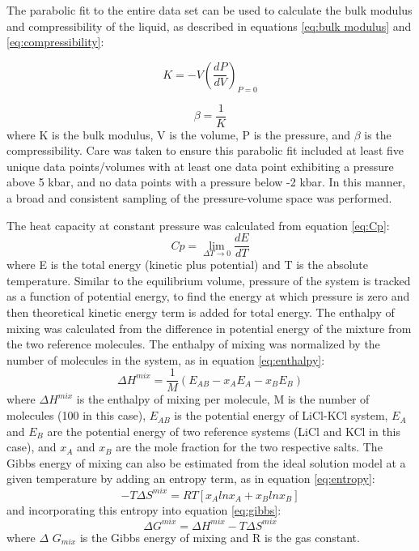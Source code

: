 \documentclass[review]{elsarticle}
\begin{document}
The parabolic fit to the entire data set can be used to calculate the bulk modulus and compressibility of the liquid, as described in equations \ref{eq:bulk modulus} and \ref{eq:compressibility}:

\begin{equation}
\label{eq:bulk modulus}
K = -V {(\frac{dP}{dV})}_{P=0}
\end{equation}

\begin{equation}
\label{eq:compressibility}
\beta = \frac{1}{K}
\end{equation}where K is the bulk modulus, V is the volume, P is the pressure, and $\beta$ is the compressibility. Care was taken to ensure this parabolic fit included at least five unique data points/volumes with at least one data point exhibiting a pressure above 5 kbar, and no data points with a pressure below  -2 kbar. In this manner, a broad and consistent sampling of the pressure-volume space was performed. 

The heat capacity at constant pressure was calculated from equation \ref{eq:Cp}:
\begin{equation}
\label{eq:Cp}
Cp =\lim_{\Delta T\to0} \frac{dE}{dT}
\end{equation}
where E is the total energy (kinetic plus potential) and T is the absolute temperature. Similar to the equilibrium volume, pressure of the system is tracked as a function of potential energy, to find the energy at which pressure is zero and then theoretical kinetic energy term is added for total energy. The enthalpy of mixing was calculated from the difference in potential energy of the mixture from the two reference molecules. The enthalpy of mixing was normalized by the number of molecules in the system, as in equation \ref{eq:enthalpy}:
\begin{equation}
    \label{eq:enthalpy}
    \Delta H^{mix} = \frac{1}{M}(E_{AB} - x_A E_A - x_B E_B)
\end{equation} 
where $\Delta H^{mix}$ is the enthalpy of mixing per molecule, M is the number of molecules (100 in this case), $E_{AB}$ is the potential energy of LiCl-KCl system, $E_A$ and $E_B$ are the potential energy of two reference systems (LiCl and KCl in this case), and $x_A$ and $x_B$ are the mole fraction for the two respective salts. The Gibbs energy of mixing can also be estimated from the ideal solution model \cite{dehoff2006} at a given temperature by adding an entropy term, as in equation \ref{eq:entropy}: 
\begin{equation}
    \label{eq:entropy}
    -T \Delta S^{mix}= RT[x_A ln x_A + x_B ln x_B]
\end{equation}and incorporating this entropy into  equation \ref{eq:gibbs}:
\begin{equation}
    \label{eq:gibbs}
    \Delta G^{mix} = \Delta H^{mix} -T \Delta S^{mix}
\end{equation}
where $\Delta$ $G_{mix}$ is the Gibbs energy of mixing and R is the gas constant.
\end{document}
